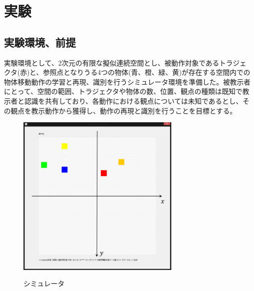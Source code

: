 ﻿%
\chapter{実験}

\section{実験環境、前提}

実験環境として、2次元の有限な擬似連続空間とし、被動作対象であるトラジェクタ(赤)と、参照点となりうる4つの物体(青、橙、緑、黄)が存在する空間内での物体移動動作の学習と再現、識別を行うシミュレータ環境を準備した。被教示者にとって、空間の範囲、トラジェクタや物体の数、位置、観点の種類は既知で教示者と認識を共有しており、各動作における観点については未知であるとし、その観点を教示動作から獲得し、動作の再現と識別を行うことを目標とする。
	\begin{figure}[b]
		\begin{center}
			\includegraphics[width=8cm]{figure3.png} \\ %
			\caption{シミュレータ}
		\end{center}
	\end{figure}

